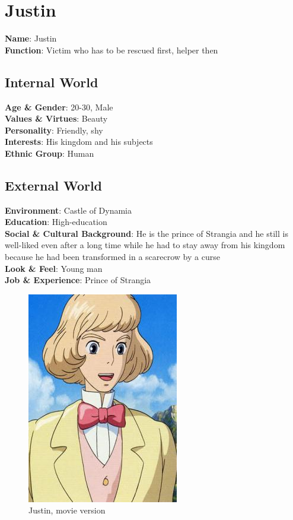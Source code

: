 \section{Justin}

\begin{minipage}{0.5\textwidth}
\textbf{Name}: Justin \\
\textbf{Function}: Victim who has to be rescued first, helper then

\subsection{Internal World}

\textbf{Age \& Gender}: 20-30, Male \\
\textbf{Values \& Virtues}: Beauty \\
\textbf{Personality}: Friendly, shy \\
\textbf{Interests}: His kingdom and his subjects \\
\textbf{Ethnic Group}: Human

\subsection{External World}
\textbf{Environment}: Castle of Dynamia \\
\textbf{Education}: High-education \\
\textbf{Social \& Cultural Background}: He is the prince of Strangia and he still is well-liked even after a long time while he had to stay away from his kingdom because he had been transformed in a scarecrow by a curse \\
\textbf{Look \& Feel}: Young man   \\
\textbf{Job \& Experience}: Prince of Strangia \\

\end{minipage}%
%
\hfill\begin{minipage}{0.4\textwidth}
  \begin{figure}[H]
  \includegraphics{Images/Characters/justin}
  \caption{Justin, movie version }
\end{figure}
\end{minipage}

